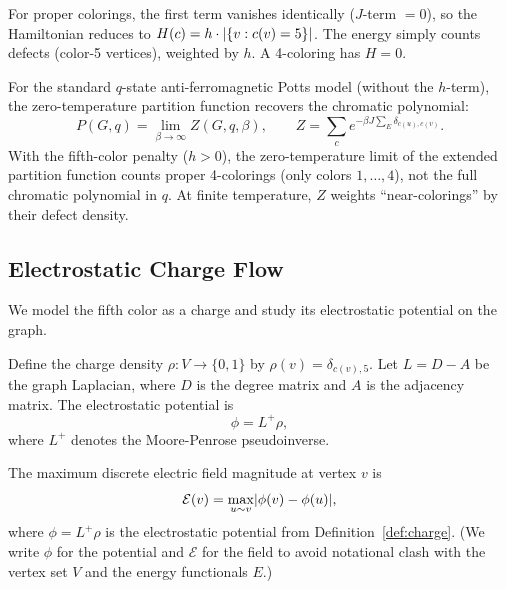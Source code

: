 For proper colorings, the first term vanishes identically ($J$-term
$= 0$), so the Hamiltonian reduces to
$H(c) = h \cdot \lvert \{v : c(v) = 5\} \rvert$. The energy simply counts
defects (color-5 vertices), weighted by $h$. A 4-coloring has $H = 0$.

\begin{remark}\label{rem:potts-chromatic}
For the standard $q$-state anti-ferromagnetic Potts model (without
the $h$-term), the zero-temperature partition function recovers the
chromatic polynomial:
\begin{equation}
  P(G, q) = \lim_{\beta \to \infty} Z(G, q, \beta),
    \qquad
  Z = \sum_c e^{-\beta J \sum_{E} \delta_{c(u),c(v)}}.
\end{equation}
With the fifth-color penalty ($h > 0$), the zero-temperature limit
of the extended partition function counts proper 4-colorings (only
colors $1, \ldots, 4$), not the full chromatic polynomial in $q$.
At finite temperature, $Z$ weights ``near-colorings'' by their defect
density.
\end{remark}

\subsection{Electrostatic Charge Flow}\label{sec:electrostatic}

We model the fifth color as a charge and study its electrostatic
potential on the graph.

\begin{definition}\label{def:charge}
Define the charge density $\rho \colon V \to \{0, 1\}$ by
$\rho(v) = \delta_{c(v), 5}$. Let $L = D - A$ be the graph Laplacian,
where $D$ is the degree matrix and $A$ is the adjacency matrix. The
electrostatic potential is
\begin{equation}\label{eq:potential}
  \phi = L^+ \rho,
\end{equation}
where $L^+$ denotes the Moore-Penrose pseudoinverse.
\end{definition}

\begin{definition}\label{def:e-field}
The maximum discrete electric field magnitude at vertex $v$ is
\begin{equation}\label{eq:e-field}
  \mathcal{E}(v) = \max_{u \sim v} \lvert \phi(v) - \phi(u) \rvert,
\end{equation}
where $\phi = L^+ \rho$ is the electrostatic potential from
Definition~\ref{def:charge}. (We write $\phi$ for the potential and
$\mathcal{E}$ for the field to avoid notational clash with the vertex
set $V$ and the energy functionals $E$.)
\end{definition}

